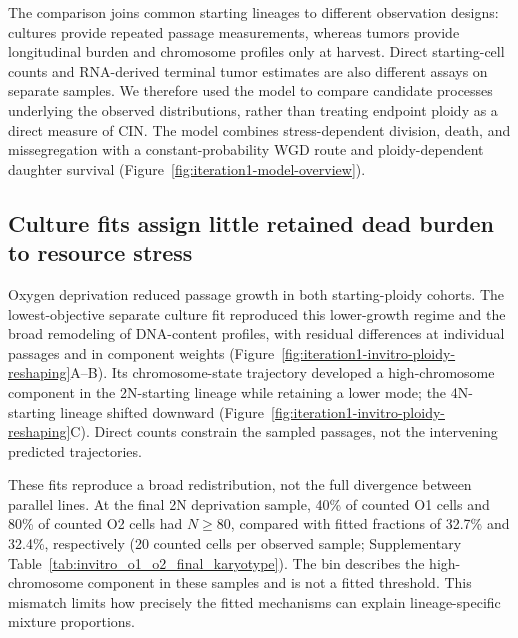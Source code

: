 \documentclass[11pt]{article}
\begin{document}
The comparison joins common starting lineages to different observation designs: cultures provide repeated passage measurements, whereas tumors provide longitudinal burden and chromosome profiles only at harvest. Direct starting-cell counts and RNA-derived terminal tumor estimates are also different assays on separate samples. We therefore used the model to compare candidate processes underlying the observed distributions, rather than treating endpoint ploidy as a direct measure of CIN. The model combines stress-dependent division, death, and missegregation with a constant-probability WGD route and ploidy-dependent daughter survival (Figure~\ref{fig:iteration1-model-overview}).

\subsection*{Culture fits assign little retained dead burden to resource stress}

Oxygen deprivation reduced passage growth in both starting-ploidy cohorts. The lowest-objective separate culture fit reproduced this lower-growth regime and the broad remodeling of DNA-content profiles, with residual differences at individual passages and in component weights (Figure~\ref{fig:iteration1-invitro-ploidy-reshaping}A--B). Its chromosome-state trajectory developed a high-chromosome component in the 2N-starting lineage while retaining a lower mode; the 4N-starting lineage shifted downward (Figure~\ref{fig:iteration1-invitro-ploidy-reshaping}C). Direct counts constrain the sampled passages, not the intervening predicted trajectories.

These fits reproduce a broad redistribution, not the full divergence between parallel lines. At the final 2N deprivation sample, 40\% of counted O1 cells and 80\% of counted O2 cells had $N\geq80$, compared with fitted fractions of 32.7\% and 32.4\%, respectively (20 counted cells per observed sample; Supplementary Table~\ref{tab:invitro_o1_o2_final_karyotype}). The bin describes the high-chromosome component in these samples and is not a fitted threshold. This mismatch limits how precisely the fitted mechanisms can explain lineage-specific mixture proportions.
\end{document}
